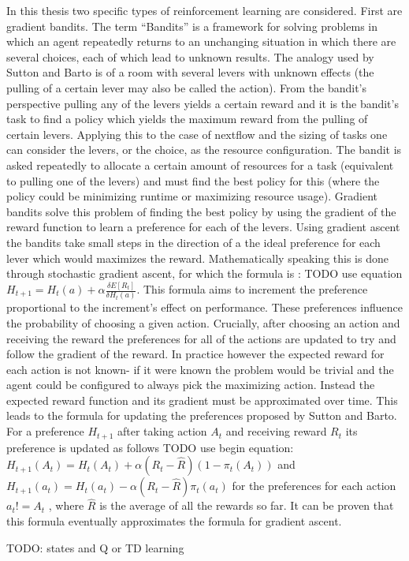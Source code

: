 In this thesis two specific types of reinforcement learning are considered. First are gradient bandits. The term ``Bandits'' is a framework for solving problems in which an agent repeatedly returns to an unchanging situation in which there are several choices, each of which lead to unknown results. The analogy used by Sutton and Barto is of a room with several levers with unknown effects (the pulling of a certain lever may also be called the action). From the bandit's perspective pulling any of the levers yields a certain reward and it is the bandit's task to find a policy which yields the maximum reward from the pulling of certain levers. Applying this to the case of nextflow and the sizing of tasks one can consider the levers, or the choice, as the resource configuration. The bandit is asked repeatedly to allocate a certain amount of resources for a task (equivalent to pulling one of the levers) and must find the best policy for this (where the policy could be minimizing runtime or maximizing resource usage). Gradient bandits solve this problem of finding the best policy by using the gradient of the reward function to learn a preference for each of the levers. Using gradient ascent the bandits take small steps in the direction of a the ideal preference for each lever which would maximizes the reward. Mathematically speaking this is done through stochastic gradient ascent, for which the formula is : TODO use equation $H_{t+1} = H_t(a) + \alpha \frac{ \delta E[R_t] }  {\delta H_t(a)}$. This formula aims to increment the preference proportional to the increment's effect on performance. These preferences influence the probability of choosing a given action. Crucially, after choosing an action and receiving the reward the preferences for all of the actions are updated to try and follow the gradient of the reward. In practice however the expected reward for each action is not known- if it were known the problem would be trivial and the agent could be configured to always pick the maximizing action. Instead the expected reward function and its gradient must be approximated over time. This leads to the formula for updating the preferences proposed by Sutton and Barto. For a preference $H_{t+1}$ after taking action $A_t$ and receiving reward $R_t$ its preference is updated as follows TODO use begin equation: $H_{t+1}(A_t) = H_t(A_t) + \alpha (R_t - \hat{R}) (1 - \pi_t(A_t))$ and $H_{t+1}(a_t) = H_t(a_t) - \alpha (R_t - \hat{R})\pi_t(a_t)$ for the preferences for each action $a_t != A_t$ , where $\hat{R}$ is the average of all the rewards so far. It can be proven that this formula eventually approximates the formula for gradient ascent.

TODO: states and Q or TD learning
